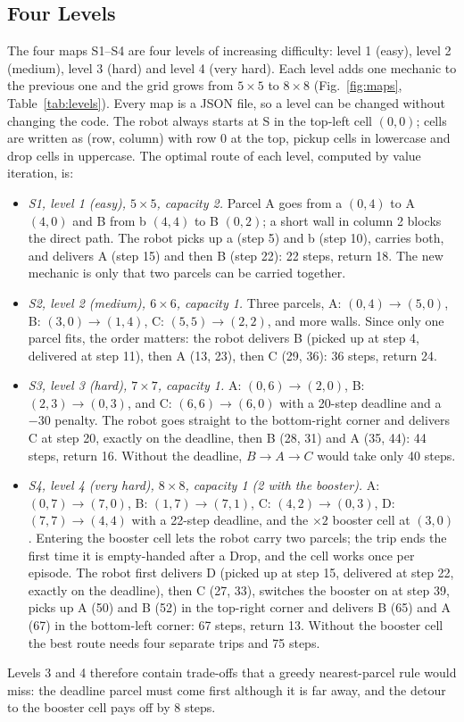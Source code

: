 \documentclass[conference]{IEEEtran}
\begin{document}
\subsection{Four Levels}
The four maps S1--S4 are four levels of increasing difficulty: level 1 (easy), level 2 (medium), level 3 (hard) and level 4 (very hard). Each level adds one mechanic to the previous one and the grid grows from $5\times5$ to $8\times8$ (Fig.~\ref{fig:maps}, Table~\ref{tab:levels}). Every map is a JSON file, so a level can be changed without changing the code. The robot always starts at S in the top-left cell $(0,0)$; cells are written as (row, column) with row 0 at the top, pickup cells in lowercase and drop cells in uppercase. The optimal route of each level, computed by value iteration, is:
\begin{itemize}
\item \emph{S1, level 1 (easy), $5\times5$, capacity 2.} Parcel A goes from a $(0,4)$ to A $(4,0)$ and B from b $(4,4)$ to B $(0,2)$; a short wall in column 2 blocks the direct path. The robot picks up a (step 5) and b (step 10), carries both, and delivers A (step 15) and then B (step 22): 22 steps, return 18. The new mechanic is only that two parcels can be carried together.
\item \emph{S2, level 2 (medium), $6\times6$, capacity 1.} Three parcels, A: $(0,4)\rightarrow(5,0)$, B: $(3,0)\rightarrow(1,4)$, C: $(5,5)\rightarrow(2,2)$, and more walls. Since only one parcel fits, the order matters: the robot delivers B (picked up at step 4, delivered at step 11), then A (13, 23), then C (29, 36): 36 steps, return 24.
\item \emph{S3, level 3 (hard), $7\times7$, capacity 1.} A: $(0,6)\rightarrow(2,0)$, B: $(2,3)\rightarrow(0,3)$, and C: $(6,6)\rightarrow(6,0)$ with a 20-step deadline and a $-30$ penalty. The robot goes straight to the bottom-right corner and delivers C at step 20, exactly on the deadline, then B (28, 31) and A (35, 44): 44 steps, return 16. Without the deadline, $B\rightarrow A\rightarrow C$ would take only 40 steps.
\item \emph{S4, level 4 (very hard), $8\times8$, capacity 1 (2 with the booster).} A: $(0,7)\rightarrow(7,0)$, B: $(1,7)\rightarrow(7,1)$, C: $(4,2)\rightarrow(0,3)$, D: $(7,7)\rightarrow(4,4)$ with a 22-step deadline, and the $\times2$ booster cell at $(3,0)$. Entering the booster cell lets the robot carry two parcels; the trip ends the first time it is empty-handed after a Drop, and the cell works once per episode. The robot first delivers D (picked up at step 15, delivered at step 22, exactly on the deadline), then C (27, 33), switches the booster on at step 39, picks up A (50) and B (52) in the top-right corner and delivers B (65) and A (67) in the bottom-left corner: 67 steps, return 13. Without the booster cell the best route needs four separate trips and 75 steps.
\end{itemize}
Levels 3 and 4 therefore contain trade-offs that a greedy nearest-parcel rule would miss: the deadline parcel must come first although it is far away, and the detour to the booster cell pays off by 8 steps.
\end{document}
